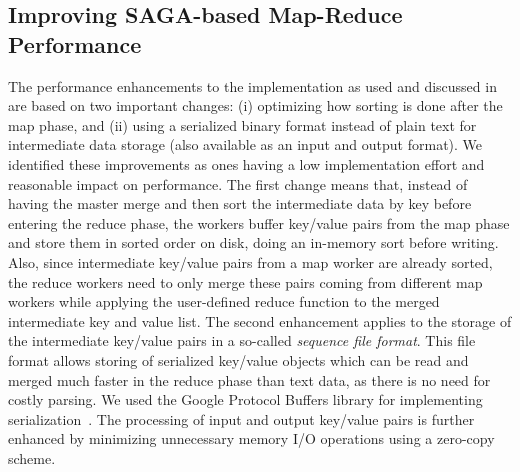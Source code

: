 \documentclass[3p,twocolumn]{elsarticle}
\begin{document}
\subsection{Improving SAGA-based Map-Reduce Performance}


The performance enhancements to the \sagamapreduce implementation as
used and discussed in~\cite{saga_ccgrid09} are based on two important
changes: (i) optimizing how sorting is done after the map phase,
and (ii) using a serialized binary format instead
of plain text for intermediate data storage (also available as an
input and output format). We identified these improvements as ones
having a low implementation effort and reasonable impact on performance.
   The first change means that,
instead of having the master merge and then sort the intermediate data
by key before entering the reduce phase, the workers buffer key/value
pairs from the map phase and store them in sorted order on disk, doing
an in-memory sort before writing. Also, since intermediate key/value
pairs from a map worker are already sorted, the reduce workers need to
only merge these pairs coming from different map workers while
applying the user-defined reduce function to the merged intermediate
key and value list.  The second enhancement applies to the storage of
the intermediate key/value pairs in a so-called \emph{sequence file
  format}. This file format allows storing of serialized key/value
objects which can be read and merged much faster in the reduce phase
than text data, as there is no need for costly parsing.  We used the
Google Protocol Buffers library for implementing
serialization~\cite{protobuf}. The processing of input and output
key/value pairs is further enhanced by minimizing unnecessary memory
I/O operations using a zero-copy scheme.

\end{document}
